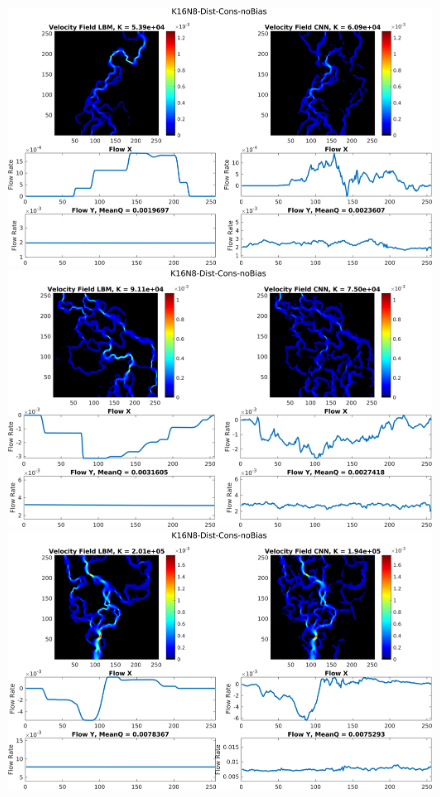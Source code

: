 \documentclass{article}
\begin{document}
\begin{figure}[htp!]
  \centering
  \begin{minipage}[b]{0.49\textwidth}
    \includegraphics[width=\textwidth]{figures/velCNNs494-6.png}
  \end{minipage}
  \hfill
  \begin{minipage}[b]{0.49\textwidth}
    \includegraphics[width=\textwidth]{figures/velCNNs68-6.png}
  \end{minipage}
    \begin{minipage}[b]{0.49\textwidth}
    \includegraphics[width=\textwidth]{figures/velCNNs1529-6.png}

\end{minipage}
\end{figure}
\end{document}
